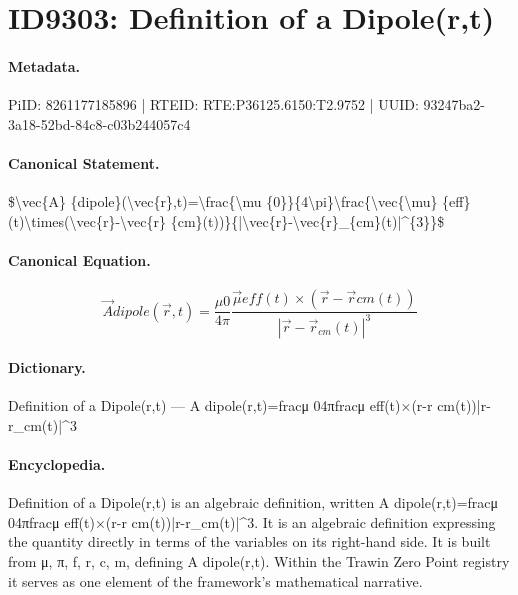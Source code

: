 \section*{ID9303: Definition of a Dipole(r,t)}
\paragraph{Metadata.}
PiID: 8261177185896 | RTEID: RTE:P36125.6150:T2.9752 | UUID: 93247ba2-3a18-52bd-84c8-c03b244057c4

\paragraph{Canonical Statement.}
\$\textbackslash{}vec\{A\} \{dipole\}(\textbackslash{}vec\{r\},t)=\textbackslash{}frac\{\textbackslash{}mu \{0\}\}\{4\textbackslash{}pi\}\textbackslash{}frac\{\textbackslash{}vec\{\textbackslash{}mu\} \{eff\}(t)\textbackslash{}times(\textbackslash{}vec\{r\}-\textbackslash{}vec\{r\} \{cm\}(t))\}\{|\textbackslash{}vec\{r\}-\textbackslash{}vec\{r\}\_\{cm\}(t)|\textasciicircum{}\{3\}\}\$

\paragraph{Canonical Equation.}
\[
\vec{A} {dipole}(\vec{r},t)=\frac{\mu {0}}{4\pi}\frac{\vec{\mu} {eff}(t)\times(\vec{r}-\vec{r} {cm}(t))}{|\vec{r}-\vec{r}_{cm}(t)|^{3}}
\]

\paragraph{Dictionary.}
Definition of a Dipole(r,t) — A dipole(r,t)=fracμ 04πfracμ eff(t)×(r-r cm(t))|r-r\_cm(t)|\textasciicircum{}3

\paragraph{Encyclopedia.}
Definition of a Dipole(r,t) is an algebraic definition, written A dipole(r,t)=fracμ 04πfracμ eff(t)×(r-r cm(t))|r-r\_cm(t)|\textasciicircum{}3. It is an algebraic definition expressing the quantity directly in terms of the variables on its right-hand side. It is built from μ, π, f, r, c, m, defining A dipole(r,t). Within the Trawin Zero Point registry it serves as one element of the framework's mathematical narrative.
